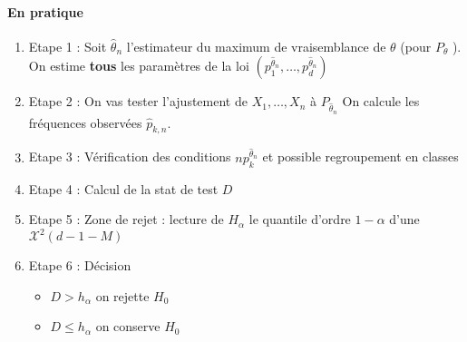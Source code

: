 \documentclass{article}
\theoremstyle{plain}%
\theoremstyle{definition}
\theoremstyle{remark}
\begin{document}
\paragraph{En pratique}
\begin{enumerate}
    \item Etape 1 : Soit $ \hat{\theta }_n $ l'estimateur du maximum de vraisemblance de $ \theta  $ (pour $ P_\theta  $ ). On estime \textbf{tous} les paramètres de la loi $ (p_1^{\hat{\theta }_n}, \dots, p_d^{\hat{\theta }_n}) $ 
    \item Etape 2 : On vas tester l'ajustement de $ X_1, \dots, X_n $ à $ P_{\hat{\theta }_n} $ On calcule les fréquences observées $ \hat{p}_{k,n} $.
    \item Etape 3 : Vérification des conditions $ np_k^{\hat{\theta }_n} $ et possible regroupement en classes 
    \item Etape 4 : Calcul de la stat de test $ D $ 
    \item Etape 5 : Zone de rejet : lecture de $ H_\alpha  $ le quantile d'ordre $ 1-\alpha  $ d'une $ \mathcal{X}^2(d-1-M) $ 
    \item Etape 6 : Décision 
        \begin{itemize}
            \item $ D > h_\alpha  $ on rejette $ H_0 $ 
            \item $ D \leq h_\alpha  $ on conserve $ H_0 $ 
        \end{itemize}
\end{enumerate}
\end{document}
